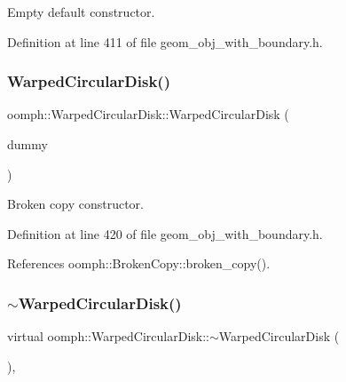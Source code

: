 Empty default constructor. 



Definition at line 411 of file geom\+\_\+obj\+\_\+with\+\_\+boundary.\+h.

\mbox{\label{classoomph_1_1WarpedCircularDisk_af7db1deb57f0f21ee5264a6590ccd5ee}} 
\subsubsection{\texorpdfstring{Warped\+Circular\+Disk()}{WarpedCircularDisk()}\hspace{0.1cm}{\footnotesize\ttfamily [3/3]}}
{\footnotesize\ttfamily oomph\+::\+Warped\+Circular\+Disk\+::\+Warped\+Circular\+Disk (\begin{DoxyParamCaption}\item[{const \hyperlink{classoomph_1_1WarpedCircularDisk}{Warped\+Circular\+Disk} \&}]{dummy }\end{DoxyParamCaption})\hspace{0.3cm}{\ttfamily [inline]}}



Broken copy constructor. 



Definition at line 420 of file geom\+\_\+obj\+\_\+with\+\_\+boundary.\+h.



References oomph\+::\+Broken\+Copy\+::broken\+\_\+copy().

\mbox{\label{classoomph_1_1WarpedCircularDisk_ad56452d9635cd7ac0d09c547023d47ef}} 
\subsubsection{\texorpdfstring{$\sim$\+Warped\+Circular\+Disk()}{~WarpedCircularDisk()}}
{\footnotesize\ttfamily virtual oomph\+::\+Warped\+Circular\+Disk\+::$\sim$\+Warped\+Circular\+Disk (\begin{DoxyParamCaption}{ }\end{DoxyParamCaption})\hspace{0.3cm}{\ttfamily [inline]}, {\ttfamily [virtual]}}




